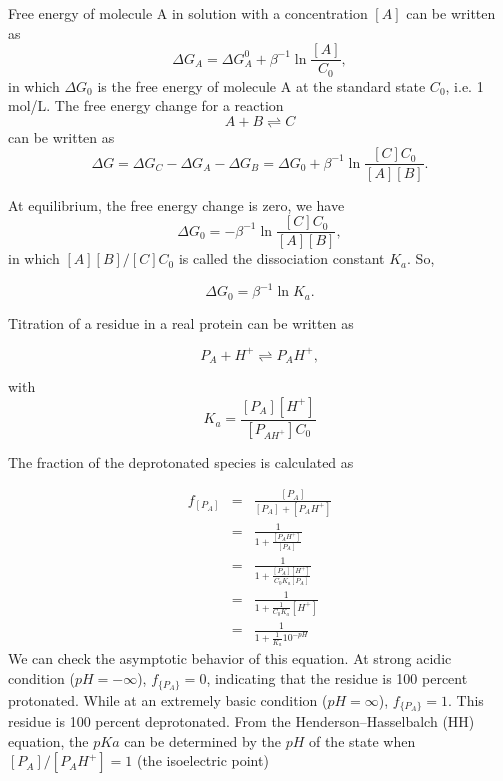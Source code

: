 Free energy of molecule A in solution with a concentration $\left[A\right]$
can be written as 
\[
\Delta G_{A}=\Delta G_{A}^{0}+\beta^{-1}\ln\frac{\left[A\right]}{C_{0}},
\]
in which $\Delta G_{0}$ is the free energy of molecule A at the standard
state $C_{0}$, i.e. 1 mol/L. The free energy change for a reaction
\[
A+B\rightleftharpoons C
\]
can be written as
\[
\Delta G=\Delta G_{C}-\Delta G_{A}-\Delta G_{B}=\Delta G_{0}+\beta^{-1}\ln\frac{\left[C\right]C_{0}}{\left[A\right]\left[B\right]}.
\]

At equilibrium, the free energy change is zero, we have
\begin{equation}
	\Delta G_{0}=-\beta^{-1}\ln\frac{\left[C\right]C_{0}}{\left[A\right]\left[B\right]},\label{eq:FEM:REMD:standardfreeenergy}
\end{equation}
in which $\left[A\right]\left[B\right]/\left[C\right]C_{0}$ is called
the dissociation constant $K_{a}$. So,

\begin{equation}
\Delta G_{0}=\beta^{-1}\ln K_{a}.
\label{eq:FEM:REMD:standardfreeenergyvsKa}
\end{equation}

Titration of a residue in a real protein can be written as

\[
P_{A}+H^{+}\rightleftharpoons P_{A}H^{+},
\]

with 
\[
K_{a}=\frac{\left[P_{A}\right]\left[H^{+}\right]}{\left[P_{AH^{+}}\right]C_{0}}
\]

The fraction of the deprotonated species is calculated as

\begin{eqnarray}
	f_{\left[P_{A}\right]} & = & \frac{\left[P_{A}\right]}{\left[P_{A}\right]+\left[P_{A}H^{+}\right]}\nonumber \\
	& = & \frac{1}{1+\frac{\left[P_{A}H^{+}\right]}{\left[P_{A}\right]}}\nonumber \\
	& = & \frac{1}{1+\frac{\left[P_{A}\right]\left[H^{+}\right]}{C_{0}K_{a}\left[P_{A}\right]}}\nonumber \\
	& = & \frac{1}{1+\frac{1}{C_{0}K_{a}}\left[H^{+}\right]}\nonumber \\
	& = & \frac{1}{1+\frac{1}{K_{a}}10^{-pH}}\label{eq:FEM:REMD:titrationcurve}
\end{eqnarray}
We can check the asymptotic behavior of this equation. At strong
acidic condition ($pH=-\infty$), $f_{\{P_{A}\}}=0$, indicating that
the residue is 100 percent protonated. While at an extremely basic
condition ($pH=\infty$), $f_{\{P_{A}\}}=1$. This residue is 100
percent deprotonated. From the Henderson–Hasselbalch (HH) equation, 
the $pKa$ can be determined by the $pH$ of the state when 
$\left[P_{A}\right]/\left[P_{A}H^{+}\right]=1$ (the isoelectric point)

